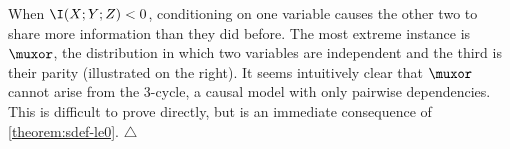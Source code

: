 When $\I(X;Y;Z) < 0$, 
conditioning on
one variable causes the other two to share more information than they did before. 
The most extreme instance is $\muxor$, the distribution in which two variables are independent and the third is their parity 
(illustrated on the right).
%
%
It seems intuitively clear that $\muxor$ cannot arise from 
the 3-cycle, a causal model with only pairwise dependencies.
This is difficult to prove directly, but is an immediate consequence of \cref{theorem:sdef-le0}.
\hfill$\triangle$
    
    
